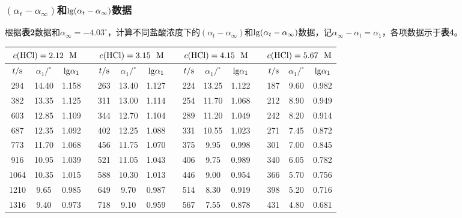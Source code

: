 \documentclass[12pt]{article}
\begin{document}
\subsubsection{$(\alpha_{t}-\alpha_{\infty})$和${\rm lg}(\alpha_{t}-\alpha_{\infty})$数据}
根据\textbf{表2}数据和$\alpha_{\infty}=-4.03^{\circ}$，计算不同盐酸浓度下的$(\alpha_{t}-\alpha_{\infty})$和${\rm lg}(\alpha_{t}-\alpha_{\infty})$数据，记$\alpha_{\infty}-\alpha_{t}=\alpha_{1}$，各项数据示于\textbf{表4}。
 \begin{table}[h]
	\centering
	\begin{tabular}{ccccccccccccccc}
		\toprule
		\multicolumn{3}{c}{$c({\rm HCl})=2.12\ \ {\rm M}$} & & \multicolumn{3}{c}{$c({\rm HCl})=3.15\ \ {\rm M}$} & & \multicolumn{3}{c}{$c({\rm HCl})=4.15\ \ {\rm M}$} & & \multicolumn{3}{c}{$c({\rm HCl})=5.67\ \ {\rm M}$} \\
		\midrule
		$t/{\rm s}$ & $\alpha_{1}/^{\circ}$ & ${\rm lg}\alpha_{1}$ & &$t/{\rm s}$ & $\alpha_{1}/^{\circ}$ & ${\rm lg}\alpha_{1}$ & &$t/{\rm s}$ & $\alpha_{1}/^{\circ}$ & ${\rm lg}\alpha_{1}$ & &$t/{\rm s}$ & $\alpha_{1}/^{\circ}$ & ${\rm lg}\alpha_{1}$  \\
		\midrule
	294  & 14.40 & 1.158 &  & 263  & 13.40 & 1.127 &  & 224  & 13.25 & 1.122 &  & 187 & 9.60 & 0.982 \\
	382  & 13.35 & 1.125 &  & 311  & 13.00 & 1.114 &  & 254  & 11.70 & 1.068 &  & 212 & 8.90 & 0.949 \\
	603  & 12.85 & 1.109 &  & 344  & 12.70 & 1.104 &  & 289  & 11.20 & 1.049 &  & 242 & 8.20 & 0.914 \\
	687  & 12.35 & 1.092 &  & 402  & 12.25 & 1.088 &  & 331  & 10.55 & 1.023 &  & 271 & 7.45 & 0.872 \\
	773  & 11.70 & 1.068 &  & 456  & 11.75 & 1.070 &  & 375  & 9.95  & 0.998 &  & 301 & 7.00 & 0.845 \\
	916  & 10.95 & 1.039 &  & 521  & 11.05 & 1.043 &  & 406  & 9.75  & 0.989 &  & 340 & 6.05 & 0.782 \\
	1064 & 10.35 & 1.015 &  & 588  & 10.30 & 1.013 &  & 446  & 9.00  & 0.954 &  & 366 & 5.70 & 0.756 \\
	1210 & 9.65  & 0.985 &  & 649  & 9.70  & 0.987 &  & 514  & 8.30  & 0.919 &  & 398 & 5.20 & 0.716 \\
	1316 & 9.40  & 0.973 &  & 718  & 9.10  & 0.959 &  & 567  & 7.55  & 0.878 &  & 431 & 4.80 & 0.681 \\

\end{tabular}
\end{table}
\end{document}
